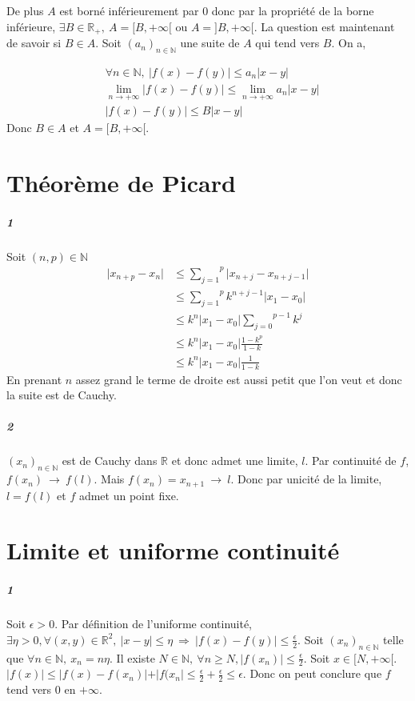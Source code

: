 \documentclass[10pt,a4paper]{article}
\newcommand{\seq}[2]{\left( #1_{#2} \right)_{#2 \in \mathbb{N}} }
\newcommand{\vertt}[1]{\vert #1 \vert}
\begin{document}
De plus $A$ est borné inférieurement par $0$ donc par la propriété de la borne inférieure, $\exists B \in \mathbb{R}_+, \ A = [B,+\infty[$ ou $A =  ]B,+\infty[$. La question est maintenant de savoir si $B \in A$. Soit $(a_n)_{n \in \mathbb{N}}$ une suite de $A$ qui tend vers $B$. On a,

\begin{equation*}
\begin{aligned}
&\forall n \in \mathbb{N}, \ \vert f(x) - f(y) \vert \le a_n \vert x-y \vert \\
&\underset{n \rightarrow +\infty}{\lim} \vert f(x) - f(y) \vert \le \underset{n \rightarrow +\infty }{\lim} a_n \vert x-y \vert \\
&\vert f(x) - f(y) \vert \le B \vert x-y \vert
\end{aligned}
\end{equation*}
Donc $B \in A$ et $A = [B,+\infty[$.

\section{Théorème de Picard}
\subparagraph{1} Soit $(n,p) \in \mathbb{N}$
\begin{equation*}
\begin{aligned}
\vert x_{n+p} -x_n \vert &\le \overset{p}{\underset{j=1}{\sum}} \vert x_{n+j} - x_{n+j-1} \vert \\
&\le \overset{p}{\underset{j=1}{\sum}} k^{n+j-1} \vert x_1 - x_0 \vert \\
&\le k^n \vert x_1 -x_0 \vert \overset{p-1}{\underset{j=0}{\sum}} k^j \\
&\le k^n \vert x_1 -x_0 \vert \frac{1 - k^{p}}{1-k} \\
&\le k^n \vert x_1-x_0 \vert \frac{1}{1-k}
\end{aligned}
\end{equation*}
En prenant $n$ assez grand le terme de droite est aussi petit que l'on veut et donc la suite est de Cauchy.
\subparagraph{2}$(x_n)_{n \in \mathbb{N}}$ est de Cauchy dans $\mathbb{R}$ et donc admet une limite, $l$. Par continuité de $f$, $f(x_n) \ \rightarrow \ f(l)$. Mais $f(x_n) = x_{n+1} \ \rightarrow \ l$. Donc par unicité de la limite, $l = f(l)$ et $f$ admet un point fixe. 

\section{Limite et uniforme continuité}
\subparagraph{1} Soit $\epsilon>0$. Par définition de l'uniforme continuité, $\exists \eta>0, \forall (x,y) \in \mathbb{R}^2, \ \vertt{x-y} \le \eta \ \Longrightarrow \ \vertt{f(x)-f(y)} \le \frac{\epsilon}{2}$. Soit $\seq{x}{n}$ telle que $\forall n \in \mathbb{N}, \ x_n = n \eta$. Il existe $N \in \mathbb{N}, \ \forall n \ge N, \vertt{f(x_n)} \le \frac{\epsilon}{2}$. Soit $x \in [N,+\infty[$. ${\vertt{f(x)} \le \vertt{f(x) - f(x_n)} + \vertt{f(x_n} \le \frac{\epsilon}{2} + \frac{\epsilon}{2} \le \epsilon}$. Donc on peut conclure que $f$ tend vers $0$ en $+\infty$.
\end{document}
